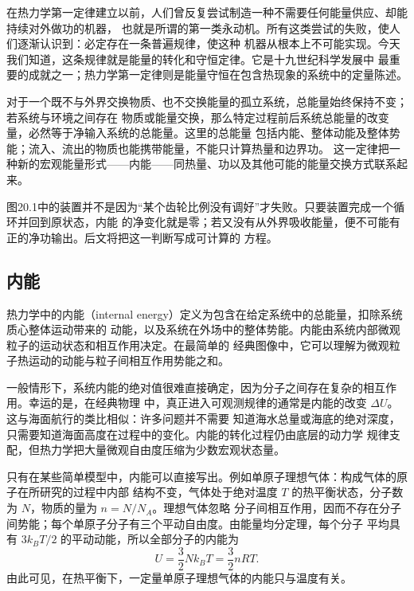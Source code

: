 在热力学第一定律建立以前，人们曾反复尝试制造一种不需要任何能量供应、却能持续对外做功的机器，
也就是所谓的第一类永动机。所有这类尝试的失败，使人们逐渐认识到：必定存在一条普遍规律，使这种
机器从根本上不可能实现。今天我们知道，这条规律就是能量的转化和守恒定律。它是十九世纪科学发展中
最重要的成就之一；热力学第一定律则是能量守恒在包含热现象的系统中的定量陈述。

对于一个既不与外界交换物质、也不交换能量的孤立系统，总能量始终保持不变；若系统与环境之间存在
物质或能量交换，那么特定过程前后系统总能量的改变量，必然等于净输入系统的总能量。这里的总能量
包括内能、整体动能及整体势能；流入、流出的物质也能携带能量，不能只计算热量和边界功。
这一定律把一种新的宏观能量形式——内能——同热量、功以及其他可能的能量交换方式联系起来。

\perpetualMotionFaithful
{}

图20.1中的装置并不是因为“某个齿轮比例没有调好”才失败。只要装置完成一个循环并回到原状态，内能
的净变化就是零；若又没有从外界吸收能量，便不可能有正的净功输出。后文将把这一判断写成可计算的
方程。

\subsection*{内能}

热力学中的内能（internal energy）定义为包含在给定系统中的总能量，扣除系统质心整体运动带来的
动能，以及系统在外场中的整体势能。内能由系统内部微观粒子的运动状态和相互作用决定。在最简单的
经典图像中，它可以理解为微观粒子热运动的动能与粒子间相互作用势能之和。

一般情形下，系统内能的绝对值很难直接确定，因为分子之间存在复杂的相互作用。幸运的是，在经典物理
中，真正进入可观测规律的通常是内能的改变 $\Delta U$。这与海面航行的类比相似：许多问题并不需要
知道海水总量或海底的绝对深度，只需要知道海面高度在过程中的变化。内能的转化过程仍由底层的动力学
规律支配，但热力学把大量微观自由度压缩为少数宏观状态量。

只有在某些简单模型中，内能可以直接写出。例如单原子理想气体：构成气体的原子在所研究的过程中内部
结构不变，气体处于绝对温度 $T$ 的热平衡状态，分子数为 $N$，物质的量为 $n=N/N_A$。理想气体忽略
分子间相互作用，因而不存在分子间势能；每个单原子分子有三个平动自由度。由能量均分定理，每个分子
平均具有 $3k_BT/2$ 的平动动能，所以全部分子的内能为
\begin{equation}
  \boxed{U=\frac32Nk_BT=\frac32nRT}. \tag{20.1}
\end{equation}
由此可见，在热平衡下，一定量单原子理想气体的内能只与温度有关。

